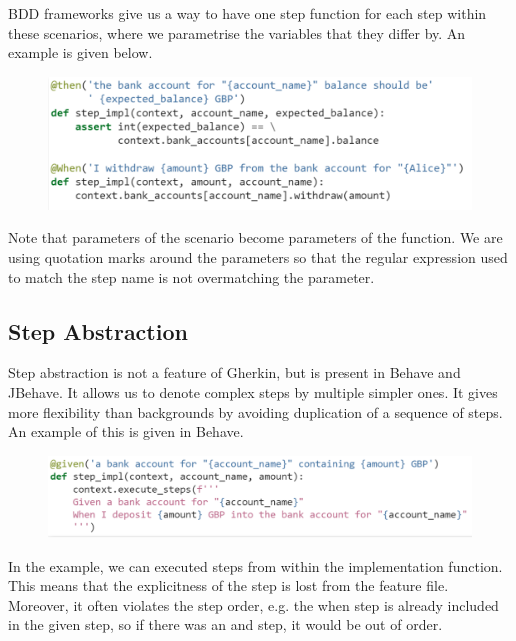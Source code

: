 \documentclass[a4paper, openany]{memoir}
\begin{document}
BDD frameworks give us a way to have one step function for each step within these scenarios, where we parametrise the variables that they differ by. An example is given below.
\begin{figure}[H]
    \centering
    \includegraphics[scale=0.5]{src/11 BDD parametrised step fn.PNG}
\end{figure}
\noindent Note that parameters of the scenario become parameters of the function. We are using quotation marks around the parameters so that the regular expression used to match the step name is not overmatching the parameter.

\subsection{Step Abstraction}
Step abstraction is not a feature of Gherkin, but is present in Behave and JBehave. It allows us to denote complex steps by multiple simpler ones. It gives more flexibility than backgrounds by avoiding duplication of a sequence of steps. An example of this is given in Behave.
\begin{figure}[H]
    \centering
    \includegraphics[scale=0.5]{src/11 BDD abstraction.PNG}
\end{figure}
\noindent In the example, we can executed steps from within the implementation function. This means that the explicitness of the step is lost from the feature file. Moreover, it often violates the step order, e.g. the when step is already included in the given step, so if there was an and step, it would be out of order.
\end{document}
